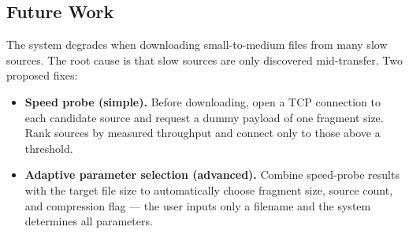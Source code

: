 \documentclass[10pt,twocolumn,a4paper]{article}
\begin{document}
\subsection{Future Work}

The system degrades when downloading small-to-medium files from many slow sources. The root cause is that slow sources are only discovered mid-transfer. Two proposed fixes:

\begin{itemize}[nosep,leftmargin=1.5em]
  \item \textbf{Speed probe (simple).} Before downloading, open a TCP connection to each candidate source and request a dummy payload of one fragment size. Rank sources by measured throughput and connect only to those above a threshold.
  \item \textbf{Adaptive parameter selection (advanced).} Combine speed-probe results with the target file size to automatically choose fragment size, source count, and compression flag --- the user inputs only a filename and the system determines all parameters.
\end{itemize}
\end{document}
